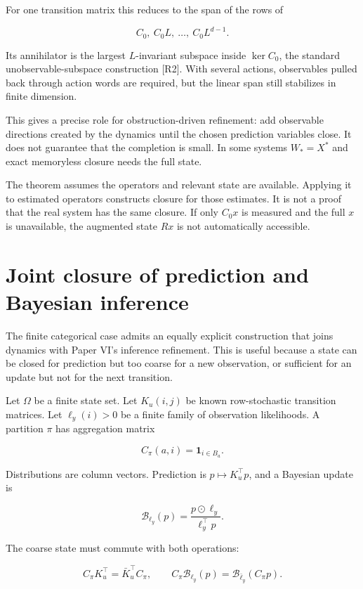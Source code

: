 For one transition matrix this reduces to the span of the rows of

\[
C_0,\ C_0L,\ \ldots,\ C_0L^{d-1}.
\]

Its annihilator is the largest \(L\)-invariant subspace inside
\(\ker C_0\), the standard unobservable-subspace construction {[}R2{]}.
With several actions, observables pulled back through action words are
required, but the linear span still stabilizes in finite dimension.

This gives a precise role for obstruction-driven refinement: add
observable directions created by the dynamics until the chosen
prediction variables close. It does not guarantee that the completion is
small. In some systems \(W_*=X^*\) and exact memoryless closure needs
the full state.

The theorem assumes the operators and relevant state are available.
Applying it to estimated operators constructs closure for those
estimates. It is not a proof that the real system has the same closure.
If only \(C_0x\) is measured and the full \(x\) is unavailable, the
augmented state \(Rx\) is not automatically accessible.

\section{Joint closure of prediction and Bayesian inference}\label{LSM:joint-closure-of-prediction-and-bayesian-inference}

The finite categorical case admits an equally explicit construction that
joins dynamics with Paper VI's inference refinement. This is useful
because a state can be closed for prediction but too coarse for a new
observation, or sufficient for an update but not for the next
transition.

Let \(\Omega\) be a finite state set. Let \(K_u(i,j)\) be known
row-stochastic transition matrices. Let \(\ell_y(i)>0\) be a finite
family of observation likelihoods. A partition \(\pi\) has aggregation
matrix

\[
C_\pi(a,i)=\mathbf 1_{i\in B_a}.
\]

Distributions are column vectors. Prediction is \(p\mapsto K_u^\top p\),
and a Bayesian update is

\[
\mathcal B_{\ell_y}(p)
=\frac{p\odot\ell_y}{\ell_y^\top p}.
\]

The coarse state must commute with both operations:

\[
C_\pi K_u^\top=\bar K_u^\top C_\pi,
\qquad
C_\pi\mathcal B_{\ell_y}(p)
=\mathcal B_{\bar\ell_y}(C_\pi p).
\]

